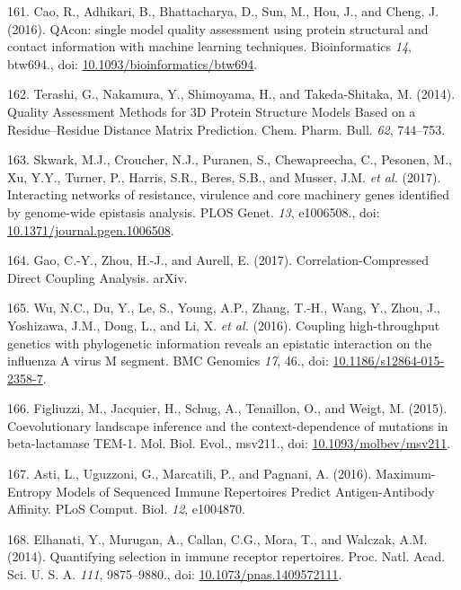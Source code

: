 \documentclass[11pt,a4paper,twoside]{book}
\theoremstyle{definition}
\theoremstyle{definition}
\theoremstyle{remark}
\begin{document}
\hypertarget{ref-Cao2016}{}
161. Cao, R., Adhikari, B., Bhattacharya, D., Sun, M., Hou, J., and
Cheng, J. (2016). QAcon: single model quality assessment using protein
structural and contact information with machine learning techniques.
Bioinformatics \emph{14}, btw694., doi:
\href{https://doi.org/10.1093/bioinformatics/btw694}{10.1093/bioinformatics/btw694}.

\hypertarget{ref-Terashi2014a}{}
162. Terashi, G., Nakamura, Y., Shimoyama, H., and Takeda-Shitaka, M.
(2014). Quality Assessment Methods for 3D Protein Structure Models Based
on a Residue--Residue Distance Matrix Prediction. Chem. Pharm. Bull.
\emph{62}, 744--753.

\hypertarget{ref-Skwark2017}{}
163. Skwark, M.J., Croucher, N.J., Puranen, S., Chewapreecha, C.,
Pesonen, M., Xu, Y.Y., Turner, P., Harris, S.R., Beres, S.B., and
Musser, J.M. \emph{et al.} (2017). Interacting networks of resistance,
virulence and core machinery genes identified by genome-wide epistasis
analysis. PLOS Genet. \emph{13}, e1006508., doi:
\href{https://doi.org/10.1371/journal.pgen.1006508}{10.1371/journal.pgen.1006508}.

\hypertarget{ref-Gao2017}{}
164. Gao, C.-Y., Zhou, H.-J., and Aurell, E. (2017).
Correlation-Compressed Direct Coupling Analysis. arXiv.

\hypertarget{ref-Wu2016}{}
165. Wu, N.C., Du, Y., Le, S., Young, A.P., Zhang, T.-H., Wang, Y.,
Zhou, J., Yoshizawa, J.M., Dong, L., and Li, X. \emph{et al.} (2016).
Coupling high-throughput genetics with phylogenetic information reveals
an epistatic interaction on the influenza A virus M segment. BMC
Genomics \emph{17}, 46., doi:
\href{https://doi.org/10.1186/s12864-015-2358-7}{10.1186/s12864-015-2358-7}.

\hypertarget{ref-Figliuzzi2015}{}
166. Figliuzzi, M., Jacquier, H., Schug, A., Tenaillon, O., and Weigt,
M. (2015). Coevolutionary landscape inference and the context-dependence
of mutations in beta-lactamase TEM-1. Mol. Biol. Evol., msv211., doi:
\href{https://doi.org/10.1093/molbev/msv211}{10.1093/molbev/msv211}.

\hypertarget{ref-Asti2016}{}
167. Asti, L., Uguzzoni, G., Marcatili, P., and Pagnani, A. (2016).
Maximum-Entropy Models of Sequenced Immune Repertoires Predict
Antigen-Antibody Affinity. PLoS Comput. Biol. \emph{12}, e1004870.

\hypertarget{ref-Elhanati2014}{}
168. Elhanati, Y., Murugan, A., Callan, C.G., Mora, T., and Walczak,
A.M. (2014). Quantifying selection in immune receptor repertoires. Proc.
Natl. Acad. Sci. U. S. A. \emph{111}, 9875--9880., doi:
\href{https://doi.org/10.1073/pnas.1409572111}{10.1073/pnas.1409572111}.
\end{document}
